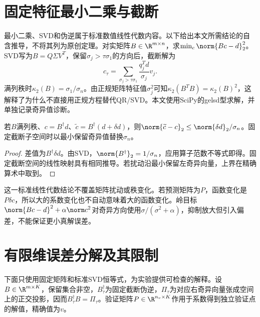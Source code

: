 \section{固定特征最小二乘与截断}
最小二乘、SVD和伪逆属于标准数值线性代数内容\cite{golub}。以下给出本文所需结论的自含推导，不将其列为原创定理。对实矩阵$B\in\R^{m\times n}$，求$\min_c\norm{Bc-d}_2^2$。SVD写为$B=Q\Sigma V^T$，保留$\sigma_j>\tau\sigma_1$的方向后，截断解为
\begin{equation}\label{eq:tsvd}
c_\tau=\sum_{\sigma_j>\tau\sigma_1}\frac{q_j^Td}{\sigma_j}v_j.
\end{equation}
满列秩时$\kappa_2(B)=\sigma_1/\sigma_n$。由正规矩阵特征值$\sigma_j^2$可知$\kappa_2(B^TB)=\kappa_2(B)^2$，这解释了为什么不直接用正规方程替代QR/SVD。本文使用SciPy的gelsd型求解，并单独记录奇异值诊断\cite{scipy}。

\begin{proposition}[固定矩阵右端扰动]
若$B$满列秩、$c=B^\dagger d$、$\widetilde c=B^\dagger(d+\delta d)$，则$\norm{\widetilde c-c}_2\le\norm{\delta d}_2/\sigma_n$。固定截断子空间时以最小保留奇异值替换$\sigma_n$。
\end{proposition}
\begin{proof}
差值为$B^\dagger\delta d$。由SVD，$\norm{B^\dagger}_2=1/\sigma_n$，应用算子范数不等式即得。固定截断空间的线性映射具有相同推导。若扰动沿最小保留左奇异向量，上界在精确算术中取到。
\end{proof}
这一标准线性代数结论不覆盖矩阵扰动或秩变化。若预测矩阵为$P$，函数变化是$P\delta c$，所以大的系数变化也不自动意味着大的函数变化。岭目标$\norm{Bc-d}^2+\alpha\norm c^2$对奇异方向使用$\sigma/(\sigma^2+\alpha)$，抑制放大但引入偏差，不能保证更小真解误差。

\section{有限维误差分解及其限制}
下面只使用固定矩阵和标准SVD恒等式\cite{golub}，为实验提供可检查的解释。设$B\in\R^{m\times K}$，保留集合非空，$B_\tau^\dagger$为固定截断伪逆，$\Pi_\tau$为对应右奇异向量张成空间上的正交投影，因而$B_\tau^\dagger B=\Pi_\tau$。验证矩阵$P\in\R^{n_v\times K}$作用于系数得到独立验证点的解值，精确值为$v$。

